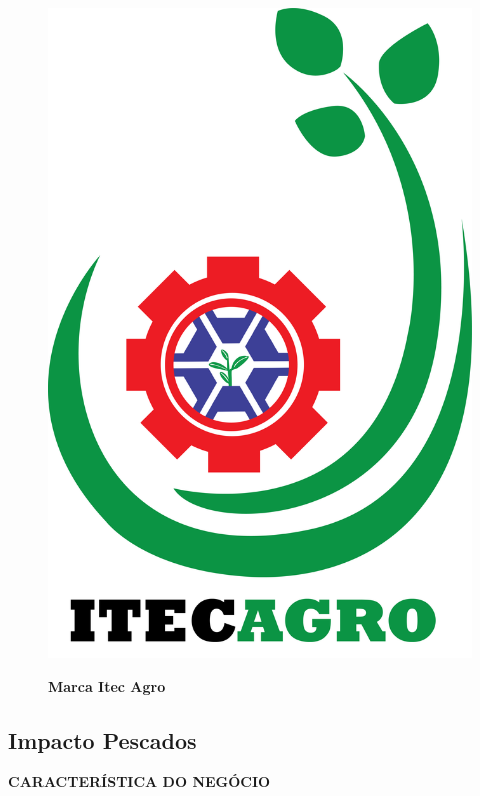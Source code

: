 \begin{figure}[!htb]
\centering
\caption{\textbf{Marca Itec Agro}}
\includegraphics[scale=0.1]{Imagens/itecagro.png}
\label{figura_22}
\end{figure}
\newpage


\subsection{Impacto Pescados}

\textbf{CARACTERÍSTICA DO NEGÓCIO}

